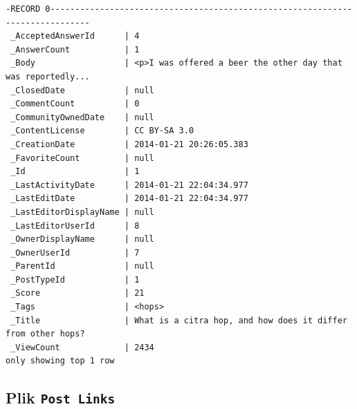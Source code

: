 \documentclass[
  letterpaper,
  DIV=11,
  numbers=noendperiod]{scrreprt}
\begin{document}
\begin{verbatim}
-RECORD 0------------------------------------------------------------------------------
 _AcceptedAnswerId      | 4                                                            
 _AnswerCount           | 1                                                            
 _Body                  | <p>I was offered a beer the other day that was reportedly... 
 _ClosedDate            | null                                                         
 _CommentCount          | 0                                                            
 _CommunityOwnedDate    | null                                                         
 _ContentLicense        | CC BY-SA 3.0                                                 
 _CreationDate          | 2014-01-21 20:26:05.383                                      
 _FavoriteCount         | null                                                         
 _Id                    | 1                                                            
 _LastActivityDate      | 2014-01-21 22:04:34.977                                      
 _LastEditDate          | 2014-01-21 22:04:34.977                                      
 _LastEditorDisplayName | null                                                         
 _LastEditorUserId      | 8                                                            
 _OwnerDisplayName      | null                                                         
 _OwnerUserId           | 7                                                            
 _ParentId              | null                                                         
 _PostTypeId            | 1                                                            
 _Score                 | 21                                                           
 _Tags                  | <hops>                                                       
 _Title                 | What is a citra hop, and how does it differ from other hops? 
 _ViewCount             | 2434                                                         
only showing top 1 row
\end{verbatim}

\normalsize

\hypertarget{plik-post-links}{%
\subsection{\texorpdfstring{Plik
\texttt{Post\ Links}}{Plik Post Links}}\label{plik-post-links}}

\small
\end{document}
